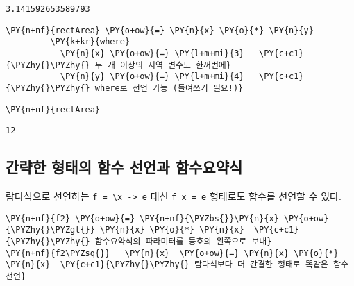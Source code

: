     
    \begin{Verbatim}[commandchars=\\\{\}]
3.141592653589793
    \end{Verbatim}

    
    \begin{tcolorbox}[breakable, size=fbox, boxrule=1pt, pad at break*=1mm,colback=cellbackground, colframe=cellborder, top=.75ex]
\begin{Verbatim}[commandchars=\\\{\}]
\PY{n+nf}{rectArea} \PY{o+ow}{=} \PY{n}{x} \PY{o}{*} \PY{n}{y}
         \PY{k+kr}{where}     
           \PY{n}{x} \PY{o+ow}{=} \PY{l+m+mi}{3}   \PY{c+c1}{\PYZhy{}\PYZhy{} 두 개 이상의 지역 변수도 한꺼번에}
           \PY{n}{y} \PY{o+ow}{=} \PY{l+m+mi}{4}   \PY{c+c1}{\PYZhy{}\PYZhy{} where로 선언 가능 (들여쓰기 필요!)}
\end{Verbatim}
\end{tcolorbox}

    \begin{tcolorbox}[breakable, size=fbox, boxrule=1pt, pad at break*=1mm,colback=cellbackground, colframe=cellborder, top=.75ex]
\begin{Verbatim}[commandchars=\\\{\}]
\PY{n+nf}{rectArea}
\end{Verbatim}
\end{tcolorbox}

    
    \begin{Verbatim}[commandchars=\\\{\}]
12
    \end{Verbatim}

    
    \hypertarget{uxac04uxb7b5uxd55c-uxd615uxd0dcuxc758-uxd568uxc218-uxc120uxc5b8uxacfc-uxd568uxc218uxc694uxc57duxc2dd}{%
\subsection{간략한 형태의 함수 선언과
함수요약식}\label{uxac04uxb7b5uxd55c-uxd615uxd0dcuxc758-uxd568uxc218-uxc120uxc5b8uxacfc-uxd568uxc218uxc694uxc57duxc2dd}}

람다식으로 선언하는 \texttt{f\ =\ \textbackslash{}x\ -\textgreater{}\ e}
대신 \texttt{f\ x\ =\ e} 형태로도 함수를 선언할 수 있다.

    \begin{tcolorbox}[breakable, size=fbox, boxrule=1pt, pad at break*=1mm,colback=cellbackground, colframe=cellborder, top=.75ex]
\begin{Verbatim}[commandchars=\\\{\}]
\PY{n+nf}{f2} \PY{o+ow}{=} \PY{n+nf}{\PYZbs{}}\PY{n}{x} \PY{o+ow}{\PYZhy{}\PYZgt{}} \PY{n}{x} \PY{o}{*} \PY{n}{x}  \PY{c+c1}{\PYZhy{}\PYZhy{} 함수요약식의 파라미터를 등호의 왼쪽으로 보내}
\PY{n+nf}{f2\PYZsq{}}   \PY{n}{x}  \PY{o+ow}{=} \PY{n}{x} \PY{o}{*} \PY{n}{x}  \PY{c+c1}{\PYZhy{}\PYZhy{} 람다식보다 더 간결한 형태로 똑같은 함수 선언}
\end{Verbatim}
\end{tcolorbox}

